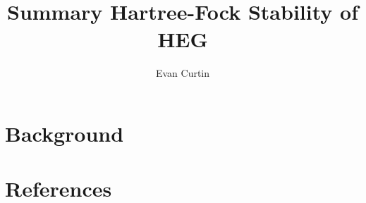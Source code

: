 \documentclass{revtex4}
\begin{document}
\title{Summary Hartree-Fock Stability of HEG}
\author{Evan Curtin}
\maketitle


\section{Background}
\cite{Guiliani2005}

\section{References}

\end{document}
